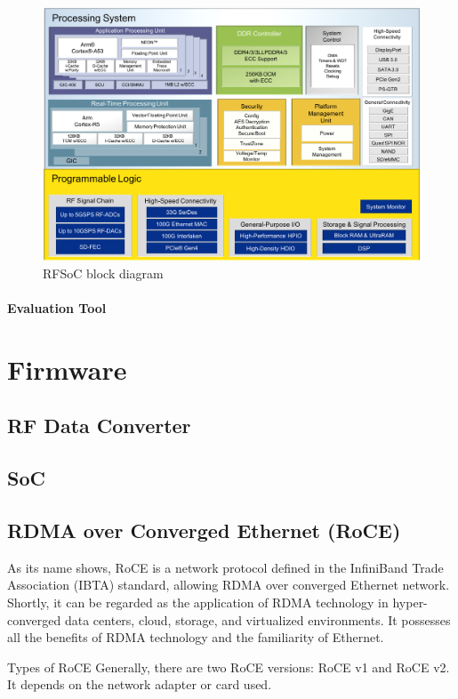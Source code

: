 \begin{figure}[tbh]
	\centering
	\includegraphics[width = \textwidth]{chap/04-work/img/rfsoc_blockdiagram}
	\caption{RFSoC block diagram}
	\label{fig:rfsoc}
\end{figure}
\paragraph{Evaluation Tool}
\section{Firmware}
\subsection{RF Data Converter}
\subsection{SoC}
\subsection{RDMA over Converged Ethernet (RoCE)}
As its name shows, RoCE is a network protocol defined in the InfiniBand Trade Association (IBTA) standard, allowing RDMA over converged Ethernet network. Shortly, it can be regarded as the application of RDMA technology in hyper-converged data centers, cloud, storage, and virtualized environments. It possesses all the benefits of RDMA technology and the familiarity of Ethernet.

Types of RoCE
Generally, there are two RoCE versions: RoCE v1 and RoCE v2. It depends on the network adapter or card used.

